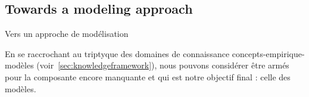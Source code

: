 \subsection*{Towards a modeling approach}{Vers un approche de modélisation}


En se raccrochant au triptyque des domaines de connaissance concepts-empirique-modèles (voir~\ref{sec:knowledgeframework}), nous pouvons considérer être armés pour la composante encore manquante et qui est notre objectif final : celle des modèles.















